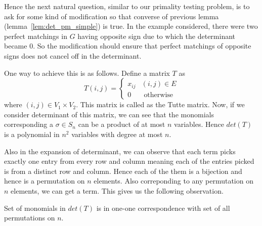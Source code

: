 Hence the next natural question, similar to our primality testing problem, is 
to ask for some kind of modification so that 
converse of previous lemma (lemma~\ref{lem:det_pm_simple}) is true. In the
example considered, there were two perfect matchings in $G$ having opposite 
sign due to which the determinant became $0$. So the modification should
ensure that perfect matchings of opposite signs does not cancel off in the
determinant.

One way to achieve this is as follows.  Define a matrix $T$ as
\[ T(i,j) = \begin{cases}
		x_{ij} & (i, j) \in E \\
		      0 & \text{ otherwise}
	\end{cases}
\]
where $(i,j) \in V_1 \times V_2$. This matrix is called as the Tutte matrix.
Now, if we consider determinant of this matrix, we can see that the monomials
corresponding a $\sigma \in S_n$ can be a product of at most $n$ variables.
Hence $det(T)$ is a polynomial in $n^2$ variables with degree at most $n$.

Also in the expansion of determinant, we can observe that each term picks
exactly one entry from every row and column meaning each of the entries 
picked is from a distinct row and column. Hence each of the them is a
bijection and hence is a permutation on $n$ elements. Also correponding to any
permutation on $n$ elements, we can get a term. This gives us the following
observation.

\begin{observation}
	Set of monomials in $det(T)$ is in one-one correspondence with set of
	all permutations on $n$.
\end{observation}



